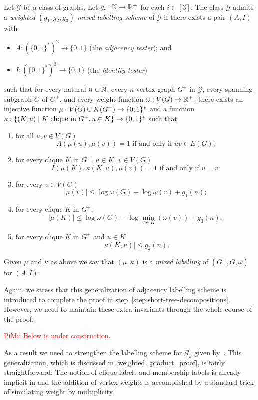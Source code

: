 \documentclass{patmorin}
\renewcommand{\le}{\leqslant}
\renewcommand{\leq}{\leqslant}
\newcommand{\piotr}[1]{\noindent\textcolor{red}{PiMi: #1}}
\newcommand{\defin}[1]{\emph{\textcolor{brightmaroon}{#1}}}
\DeclarePairedDelimiter{\set}{\{}{\}}
\newcommand{\calG}{\mathcal{G}}
\begin{document}
Let $\calG$ be a class of graphs.
Let $g_i:\mathbb{N}\to\mathbb{R}^+$ for each $i\in[3]$.
The class  $\calG$ admits a \defin{weighted $(g_1,g_2,g_3)$ mixed labelling scheme} of $\calG$ if there exists a pair $(A,I)$ with
\begin{itemize}[nosep,nolistsep]
     \item $A:(\{0,1\}^*)^2\to\{0,1\}$ (the \defin{adjacency tester}); and
     \item $I:(\{0,1\}^*)^3\to\{0,1\}$ (the \defin{identity tester})
\end{itemize}
such that
for every natural $n\in\mathbb{N}$,
every $n$-vertex graph $G^+$ in $\calG$,
every spanning subgraph $G$ of $G^+$, and
every weight function $\omega:V(G)\to \mathbb{R}^+$,
there exists an injective function $\mu: V(G)\cup K(G^+) \to \set{0,1}^*$ and a function $\kappa:\{(K, u)\mid \textrm{$K$ clique in $G^+$}, u\in K\}\to \set{0,1}^*$
such that
\begin{enumerate}[nosep,nolistsep,label=(\roman*)]
    \item for all $u,v\in V(G)$
    \[
    \textrm{$A(\mu(u),\mu(v))=1$ if and only if $uv\in E(G)$;}
    \]
    \item for every clique $K$ in $G^+$, $u\in K$, $v\in V(G)$
    \[
    \textrm{$I(\mu(K),\kappa(K, u),\mu(v))=1$ if and only if $u=v$;}
    \]
    \item for every $v\in V(G)$
    \[
    |\mu(v)| \leq \log \omega(G) - \log\omega(v) + g_1(n);
    \]
    \item for every clique $K$ in $G^+$,
    \[
    |\mu(K)|\le \log \omega(G) - \log\min_{v\in K}(\omega(v)) + g_3(n);
    \]
    \item  for every clique $K$ in $G^+$ and $u\in K$
    \[
    |\kappa(K, u)| \leq g_2(n).
    \]
\end{enumerate}
Given $\mu$ and $\kappa$  as above we say that $(\mu,\kappa)$ is a \defin{mixed labelling} of $(G^+,G,\omega)$ for $(A,I)$.

Again, we stress that this generalization of adjacency labelling scheme is introduced to complete the proof in step~\ref{step:short-tree-decompositions}. 
However, we need to maintain these extra invariants through the whole course of the proof.

\piotr{Below is under construction.}

As a result we need to strengthen the labelling scheme for $\calG_k$ given by~\citet{dujmovic.esperet.ea:adjacency}. 
This generalization, which is discussed in \cref{weighted_product_proof}, is fairly straightforward: The notion of clique labels and membership labels is already implicit in \cite{dujmovic.esperet.ea:adjacency} and the addition of vertex weights is accomplished by a  standard trick of simulating weight by multiplicity.
\end{document}
